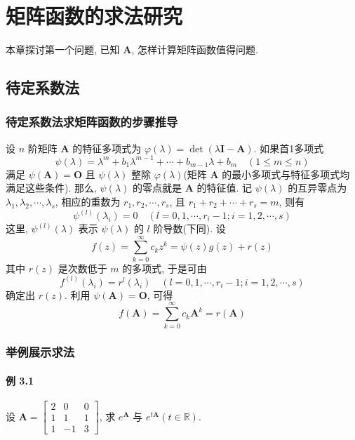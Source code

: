 \section{矩阵函数的求法研究}

本章探讨第一个问题, 已知 $\bm{A}$, 怎样计算矩阵函数值得问题.

\subsection{待定系数法}

\subsubsection{待定系数法求矩阵函数的步骤推导}

设 $n$ 阶矩阵 $\bm{A}$ 的特征多项式为 $\varphi(\lambda) = \det(\lambda \bm{I} - \bm{A})$. 如果首1多项式
$$
    \psi(\lambda) =\lambda^m + b_1 \lambda^{m-1} + \cdots + b_{m-1}\lambda + b_m \quad (1 \leqslant m \leqslant n)
$$
满足 $\psi(\bm{A}) = \bm{O}$ 且 $\psi(\lambda)$ 整除 $\varphi(\lambda)$(矩阵 $\bm{A}$ 的最小多项式与特征多项式均满足这些条件). 那么, $\psi(\lambda)$ 的零点就是 $\bm{A}$ 的特征值. 记 $\psi(\lambda)$ 的互异零点为 $\lambda_1, \lambda_2, \cdots, \lambda_s$, 相应的重数为 $r_1, r_2, \cdots, r_s$, 且 $r_1 + r_2 + \cdots + r_s = m$, 则有
$$
    \psi^{(l)}(\lambda_i) = 0 \quad (l = 0, 1, \cdots, r_i - 1; i = 1, 2, \cdots, s)
$$
这里, $\psi^{(l)}(\lambda)$ 表示 $\psi(\lambda)$ 的 $l$ 阶导数(下同). 设
$$
    f(z) = \sum\limits_{k = 0}^\infty c_k z^k = \psi(z)g(z) + r(z)
$$
其中 $r(z)$ 是次数低于 $m$ 的多项式, 于是可由
$$
    f^{(l)}(\lambda_i) = r^{l}(\lambda_i) \quad (l = 0, 1, \cdots, r_i - 1; i = 1, 2, \cdots, s)
$$
确定出 $r(z)$. 利用 $\psi(\bm{A}) = \bm{O}$, 可得
$$
    f(\bm{A}) = \sum\limits_{k=0}^\infty c_k\bm{A}^k = r(\bm{A})
$$

\subsubsection{举例展示求法}

\paragraph*{例 3.1} 设 $\bm{A} = \begin{bmatrix}
    2 & 0 & 0 \\
    1 & 1 & 1 \\
    1 & -1 & 3
\end{bmatrix}$, 求 $e^{\bm{A}}$ 与 $e^{t\bm{A}}(t \in \mathbb{R})$.

